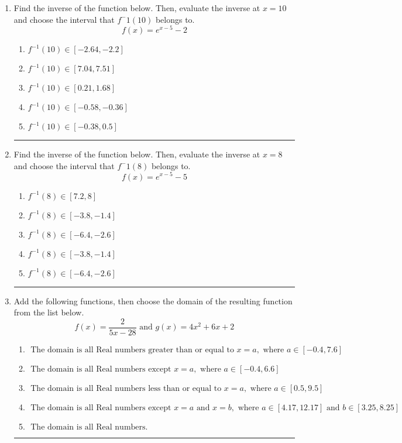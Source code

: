 \documentclass[14pt]{extbook}
\newcommand{\litem}[1]{\item#1\hspace*{-1cm}\rule{\textwidth}{0.4pt}}
\begin{document}
\begin{enumerate}
{\begin{enumerate}[label=\Alph*.]
\end{enumerate} }
\litem{
Find the inverse of the function below. Then, evaluate the inverse at $x = 10$ and choose the interval that $f^-1(10)$ belongs to.\[ f(x) = e^{x-5}-2 \]\begin{enumerate}[label=\Alph*.]
\item \( f^{-1}(10) \in [-2.64, -2.2] \)
\item \( f^{-1}(10) \in [7.04, 7.51] \)
\item \( f^{-1}(10) \in [0.21, 1.68] \)
\item \( f^{-1}(10) \in [-0.58, -0.36] \)
\item \( f^{-1}(10) \in [-0.38, 0.5] \)

\end{enumerate} }
\litem{
Find the inverse of the function below. Then, evaluate the inverse at $x = 8$ and choose the interval that $f^-1(8)$ belongs to.\[ f(x) = e^{x-5}-5 \]\begin{enumerate}[label=\Alph*.]
\item \( f^{-1}(8) \in [7.2, 8] \)
\item \( f^{-1}(8) \in [-3.8, -1.4] \)
\item \( f^{-1}(8) \in [-6.4, -2.6] \)
\item \( f^{-1}(8) \in [-3.8, -1.4] \)
\item \( f^{-1}(8) \in [-6.4, -2.6] \)

\end{enumerate} }
\litem{
Add the following functions, then choose the domain of the resulting function from the list below.\[ f(x) = \frac{2}{5x-28} \text{ and } g(x) = 4x^{2} +6 x + 2 \]\begin{enumerate}[label=\Alph*.]
\item \( \text{ The domain is all Real numbers greater than or equal to } x = a, \text{ where } a \in [-0.4, 7.6] \)
\item \( \text{ The domain is all Real numbers except } x = a, \text{ where } a \in [-0.4, 6.6] \)
\item \( \text{ The domain is all Real numbers less than or equal to } x = a, \text{ where } a \in [0.5, 9.5] \)
\item \( \text{ The domain is all Real numbers except } x = a \text{ and } x = b, \text{ where } a \in [4.17, 12.17] \text{ and } b \in [3.25, 8.25] \)
\item \( \text{ The domain is all Real numbers. } \)


\end{enumerate}}
\end{enumerate}
\end{document}
